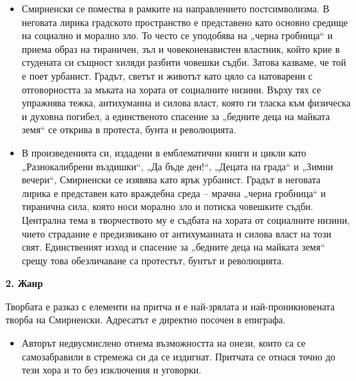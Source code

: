 \documentclass[12pt,a4paper]{article}
\begin{document}
\begin{itemize}[leftmargin=*]
\vspace{-0.45cm}
\item Смирненски се помества в рамките на направлението постсимволизма. В неговата лирика градското пространство е представено като основно средище на социално и морално зло. То често се уподобява на „черна гробница“ и приема образ на тираничен, зъл и човеконенавистен властник, който крие в студената си същност хиляди разбити човешки съдби. Затова казваме, че той е поет урбанист. Градът, светът и животът като цяло са натоварени с отговорността за мъката на хората от социалните низини. Върху тях се упражнява тежка, антихуманна и силова власт, която ги тласка към физическа и духовна погибел, а единственото спасение за „бедните деца на майката земя“ се открива в протеста, бунта и революцията.
\end{itemize}

\begin{itemize}[leftmargin=*]
\vspace{-0.45cm}
\item В произведенията си, издадени в емблематични книги и цикли като „Разнокалибрени въздишки“, „Да бъде ден!“, „Децата на града“ и „Зимни вечери“, Смирненски се изявява като ярък урбанист. Градът в неговата лирика е представен като враждебна среда – мрачна „черна гробница“ и тиранична сила, която носи морално зло и потиска човешките съдби. Централна тема в творчеството му е съдбата на хората от социалните низини, чието страдание е предизвикано от антихуманната и силова власт на този свят. Единственият изход и спасение за „бедните деца на майката земя“ срещу това обезличаване са протестът, бунтът и революцията.
\end{itemize}

\vspace{0.1cm}
 
\textbf{2. Жанр}
\vspace{0.1cm}
 
\indent Творбата е разказ с елементи на притча и е най-зрялата и най-проникновената творба на Смирненски. Адресатът е директно посочен в епиграфа.

\begin{itemize}[leftmargin=*]
\vspace{-0.25cm}
\item Авторът недвусмислено отнема възможността на онези, които са се самозабравили в стремежа си да се издигнат. Притчата се отнася точно до тези хора и то без изключения и уговорки.
\end{itemize}
 
\end{document}
